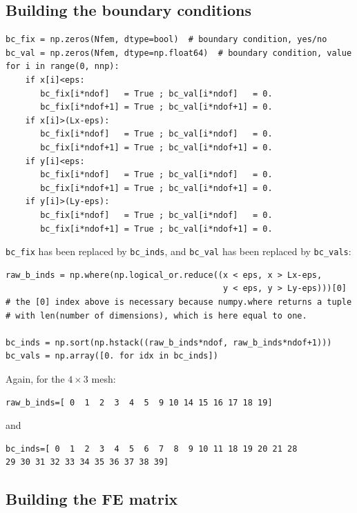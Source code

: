 \subsection*{Building the boundary conditions} 


\begin{lstlisting}
bc_fix = np.zeros(Nfem, dtype=bool)  # boundary condition, yes/no
bc_val = np.zeros(Nfem, dtype=np.float64)  # boundary condition, value
for i in range(0, nnp):
    if x[i]<eps:
       bc_fix[i*ndof]   = True ; bc_val[i*ndof]   = 0.
       bc_fix[i*ndof+1] = True ; bc_val[i*ndof+1] = 0.
    if x[i]>(Lx-eps):
       bc_fix[i*ndof]   = True ; bc_val[i*ndof]   = 0.
       bc_fix[i*ndof+1] = True ; bc_val[i*ndof+1] = 0.
    if y[i]<eps:
       bc_fix[i*ndof]   = True ; bc_val[i*ndof]   = 0.
       bc_fix[i*ndof+1] = True ; bc_val[i*ndof+1] = 0.
    if y[i]>(Ly-eps):
       bc_fix[i*ndof]   = True ; bc_val[i*ndof]   = 0.
       bc_fix[i*ndof+1] = True ; bc_val[i*ndof+1] = 0.
\end{lstlisting}


\lstinline{bc_fix} has been replaced by \lstinline{bc_inds}, and 
\lstinline{bc_val} has been replaced by \lstinline{bc_vals}:

\begin{lstlisting}
raw_b_inds = np.where(np.logical_or.reduce((x < eps, x > Lx-eps,
                                            y < eps, y > Ly-eps)))[0]
# the [0] index above is necessary because numpy.where returns a tuple
# with len(number of dimensions), which is here equal to one.

bc_inds = np.sort(np.hstack((raw_b_inds*ndof, raw_b_inds*ndof+1)))
bc_vals = np.array([0. for idx in bc_inds])
\end{lstlisting}

Again, for the $4\times 3$ mesh:
\begin{verbatim}
raw_b_inds=[ 0  1  2  3  4  5  9 10 14 15 16 17 18 19]
\end{verbatim}
and 
\begin{verbatim}
bc_inds=[ 0  1  2  3  4  5  6  7  8  9 10 11 18 19 20 21 28 
29 30 31 32 33 34 35 36 37 38 39]
\end{verbatim}

\subsection*{Building the FE matrix}

